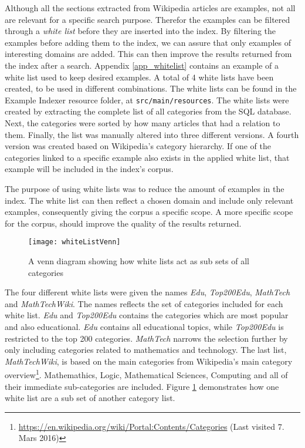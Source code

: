 Although all the sections extracted from Wikipedia articles are examples, not all are relevant for a specific search purpose. Therefor the examples can be filtered through a \textit{white list} before they are inserted into the index. By filtering the examples before adding them to the index, we can assure that only examples of interesting domains are added. This can then improve the results returned from the index after a search. Appendix \ref{app_whitelist} contains an example of a white list used to keep desired examples. A total of 4 white lists have been created, to be used in different combinations. The white lists can be found in the Example Indexer resource folder, at \texttt{src/main/resources}. The white lists were created by extracting the complete list of all categories from the SQL database. Next, the categories were sorted by how many articles that had a relation to them. Finally, the list was manually altered into three different versions. A fourth version was created based on Wikipedia's category hierarchy. If one of the categories linked to a specific example also exists in the applied white list, that example will be included in the index's corpus.

The purpose of using white lists was to reduce the amount of examples in the index. The white list can then reflect a chosen domain and include only relevant examples, consequently giving the corpus a specific scope. A more specific scope for the corpus, should improve the quality of the results returned. 

\begin{figure}[h] 
\caption{A venn diagram showing how white lists act as sub sets of all categories}
\texttt{[image: whiteListVenn]}
\label{fig:whiteListVenn}
\end{figure}
The four different white lists were given the names \textit{Edu}, \textit{Top200Edu}, \textit{MathTech} and \textit{MathTechWiki}. The names reflects the set of categories included for each white list. \textit{Edu} and \textit{Top200Edu} contains the categories which are most popular and also educational. \textit{Edu} contains all educational topics, while \textit{Top200Edu} is restricted to the top 200 categories. \textit{MathTech} narrows the selection further by only including categories related to mathematics and technology. The last list, \textit{MathTechWiki}, is based on the main categories from Wikipedia's main category overview\footnote{\url{https://en.wikipedia.org/wiki/Portal:Contents/Categories} (Last visited 7. Mars 2016)}. Mathemathics, Logic, Mathematical Sciences, Computing and all of their immediate sub-categories are included. Figure \ref{fig:whiteListVenn} demonstrates how one white list are a sub set of another category list. 

